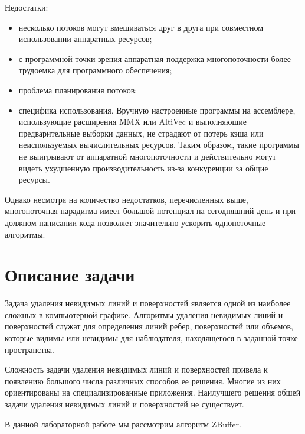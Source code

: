 Недостатки:

\begin{itemize}
	
	\item несколько потоков могут вмешиваться друг в друга при совместном использовании аппаратных ресурсов;
	
	\item с программной точки зрения аппаратная поддержка многопоточности более трудоемка для программного обеспечения;
	
	\item проблема планирования потоков;
	
	\item специфика использования. Вручную настроенные программы на ассемблере, использующие расширения MMX или AltiVec и выполняющие предварительные выборки данных, не страдают от потерь кэша или неиспользуемых вычислительных ресурсов. Таким образом, такие программы не выигрывают от аппаратной многопоточности и действительно могут видеть ухудшенную производительность из-за конкуренции за общие ресурсы.
	
\end{itemize}

Однако несмотря на количество недостатков, перечисленных выше, многопоточная парадигма имеет большой потенциал на сегодняшний день и при должном написании кода позволяет значительно ускорить однопоточные алгоритмы.

\section{Описание задачи}
Задача удаления невидимых линий и поверхностей является одной из наиболее сложных в компьютерной графике. Алгоритмы удаления невидимых линий и поверхностей служат для определения линий ребер, поверхностей или объемов, которые видимы или невидимы для наблюдателя, находящегося в заданной точке пространства.

Сложность задачи удаления невидимых линий и поверхностей привела к появлению большого числа различных способов ее решения. Многие из них ориентированы на специализированные приложения. Наилучшего решения обшей задачи удаления невидимых линий и поверхностей не существует. \cite{task}

В данной лабораторной работе мы рассмотрим алгоритм ZBuffer.
